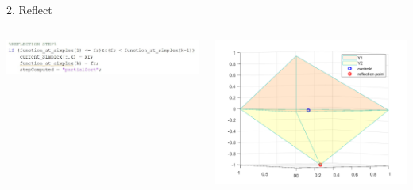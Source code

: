 \documentclass{beamer}
\begin{document}
\begin{frame}{2. Reflect}
	\begin{columns}
	\begin{column}{0.49\linewidth}
		\centering
		\includegraphics[width=0.95\linewidth]{Reflect}
	\end{column}
	\begin{column}{0.5\linewidth}
		\centering
		\includegraphics[width=0.95\linewidth]{ReflectFig}
	\end{column}
	\end{columns}
\end{frame}
\end{document}
